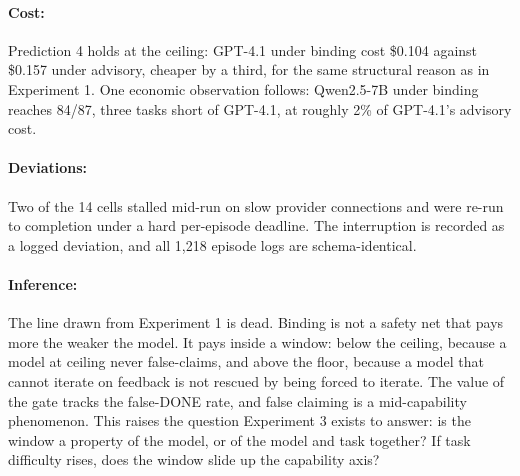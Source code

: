 \paragraph{Cost:} Prediction 4 holds at the ceiling: GPT-4.1 under binding cost \$0.104 against \$0.157 under advisory, cheaper by a third, for the same structural reason as in Experiment 1. One economic observation follows: Qwen2.5-7B under binding reaches 84/87, three tasks short of GPT-4.1, at roughly 2\% of GPT-4.1's advisory cost.

\paragraph{Deviations:} Two of the 14 cells stalled mid-run on slow provider connections and were re-run to completion under a hard per-episode deadline. The interruption is recorded as a logged deviation, and all 1,218 episode logs are schema-identical.

\paragraph{Inference:} The line drawn from Experiment 1 is dead. Binding is not a safety net that pays more the weaker the model. It pays inside a window: below the ceiling, because a model at ceiling never false-claims, and above the floor, because a model that cannot iterate on feedback is not rescued by being forced to iterate. The value of the gate tracks the false-DONE rate, and false claiming is a mid-capability phenomenon. This raises the question Experiment 3 exists to answer: is the window a property of the model, or of the model and task together? If task difficulty rises, does the window slide up the capability axis?
